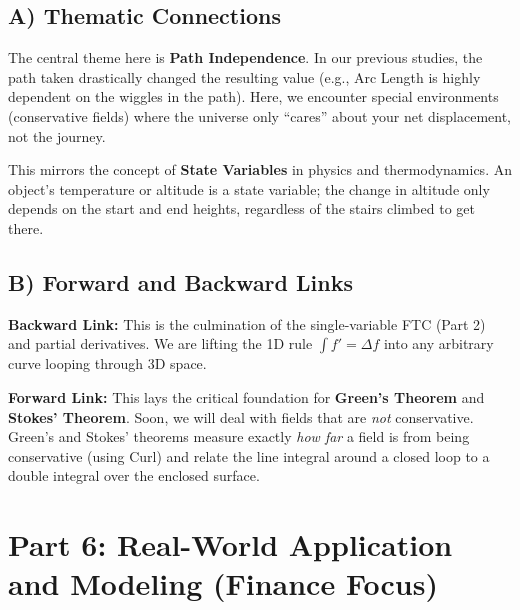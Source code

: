 \documentclass[12pt]{article}
\begin{document}
\subsection{A) Thematic Connections}
The central theme here is \textbf{Path Independence}. In our previous studies, the path taken drastically changed the resulting value (e.g., Arc Length is highly dependent on the wiggles in the path). Here, we encounter special environments (conservative fields) where the universe only ``cares'' about your net displacement, not the journey. 

This mirrors the concept of \textbf{State Variables} in physics and thermodynamics. An object's temperature or altitude is a state variable; the change in altitude only depends on the start and end heights, regardless of the stairs climbed to get there.

\subsection{B) Forward and Backward Links}
\textbf{Backward Link:} This is the culmination of the single-variable FTC (Part 2) and partial derivatives. We are lifting the 1D rule $\int f' = \Delta f$ into any arbitrary curve looping through 3D space.

\textbf{Forward Link:} This lays the critical foundation for \textbf{Green's Theorem} and \textbf{Stokes' Theorem}. Soon, we will deal with fields that are \textit{not} conservative. Green's and Stokes' theorems measure exactly \textit{how far} a field is from being conservative (using Curl) and relate the line integral around a closed loop to a double integral over the enclosed surface.

\newpage
\section{Part 6: Real-World Application and Modeling (Finance Focus)}
\end{document}
